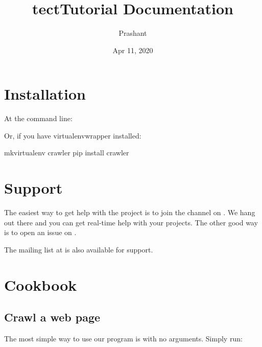 \documentclass[letterpaper,10pt,english]{sphinxmanual}
\title{tectTutorial Documentation}
\date{Apr 11, 2020}
\author{Prashant}
\begin{document}
\maketitle
\sphinxtableofcontents
{}\label{\detokenize{index::doc}}



\chapter{Installation}
\label{\detokenize{install:installation}}\label{\detokenize{install::doc}}\label{\detokenize{install:welcome-to-tecttutorial-s-documentation}}
At the command line:

%
\begin{sphinxVerbatim}[commandchars=\\\{\}]
 
\end{sphinxVerbatim}

Or, if you have virtualenvwrapper installed:

%
\begin{sphinxVerbatim}[commandchars=\\\{\}]
mkvirtualenv crawler
pip install crawler
\end{sphinxVerbatim}


\chapter{Support}
\label{\detokenize{source:support}}\label{\detokenize{source::doc}}
The easiest way to get help with the project is to join the 
channel on . We hang out there and you can get real-time help with
your projects.  The other good way is to open an issue on .

The mailing list at  is also available for support.


\chapter{Cookbook}
\label{\detokenize{cookbook:github}}\label{\detokenize{cookbook::doc}}\label{\detokenize{cookbook:cookbook}}

\section{Crawl a web page}
\label{\detokenize{cookbook:crawl-a-web-page}}
The most simple way to use our program is with no arguments.
Simply run:
\end{document}
